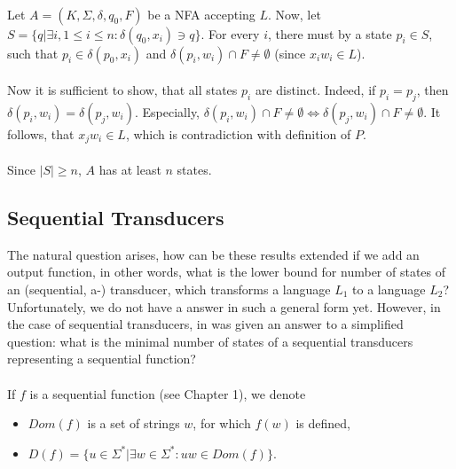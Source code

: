 \paragraph{}
\dokaz Let $A=(K, \Sigma, \delta, q_{0}, F)$ be a NFA accepting $L$. Now, let $S = \{ q | \exists i, 1\leq i \leq n: \delta (q_{0}, x_{i}) \ni q \} $. For every $i$, there must by a state $p_{i} \in S$, such that $p_{i} \in \delta (p_{0}, x_{i})$ and $\delta (p_{i}, w_{i}) \cap F \neq \emptyset $ (since $x_{i}w_{i} \in L$).

\paragraph{}
Now it is sufficient to show, that all states $p_{i}$ are distinct. Indeed, if $p_{i} = p_{j}$, then $\delta (p_{i}, w_{i}) = \delta (p_{j}, w_{i})$. Especially, $\delta (p_{i}, w_{i}) \cap F \neq \emptyset \Leftrightarrow \delta (p_{j}, w_{i}) \cap F\neq \emptyset $. It follows, that $x_{j}w_{i} \in L$, which is contradiction with definition of $P$.

\paragraph{}
Since $|S| \geq n$, $A$ has at least $n$ states. \square

\subsection{Sequential Transducers}
The natural question arises, how can be these results extended if we add an output function, in other words, what is the lower bound for number of states of an (sequential, a-) transducer, which transforms a language $L_{1}$ to a language $L_{2}$? Unfortunately, we do not have a answer in such a general form yet. However, in the case of sequential transducers, in \cite{moh:min} was given an answer to a simplified question: what is the minimal number of states of a sequential transducers representing a sequential function?

\paragraph{}
\oznacenie If $f$ is a sequential function (see Chapter 1), we denote
\begin{itemize}
\item $Dom(f)$ is a set of strings $w$, for which $f(w)$ is defined,
\item $D(f) = \{ u \in \Sigma ^{*} | \exists w \in \Sigma ^{*}: uw \in Dom(f) \} $.
\end{itemize}

